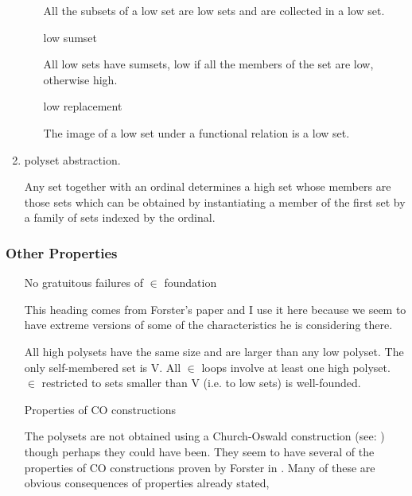 \documentclass{article}
\begin{document}
\begin{article}
\begin{enumerate}
\begin{itemize}
All the subsets of a low set are low sets and are collected in a low set.

\item [low sumset]\ 

All low sets have sumsets, low if all the members of the set are low, otherwise high.

\item [low replacement]\ 

The image of a low set under a functional relation is a low set.

\end{itemize}

\item polyset abstraction.

Any set together with an ordinal determines a high set whose members are those sets which can be obtained by instantiating a member of the first set by a family of sets indexed by the ordinal.

\end{enumerate}

\subsubsection{Other Properties}

\begin{itemize}

\item[No gratuitous failures of $\in$ foundation]\ 

This heading comes from Forster's paper \cite{forster2006} and I use it here because we seem to have extreme versions of some of the characteristics he is considering there.

All high polysets have the same size and are larger than any low polyset.
The only self-membered set is V.
All $\in$ loops involve at least one high polyset.
$\in$ restricted to sets smaller than V (i.e. to low sets) is well-founded.

\item[Properties of CO constructions]\ 

The polysets are not obtained using a Church-Oswald construction (see: \cite{forster2005}) though perhaps they could have been.
They seem to have several of the properties of CO constructions proven by Forster in \cite{forster2005}.
Many of these are obvious consequences of properties already stated,

\begin{itemize}


\end{itemize}
\end{itemize}
\end{article}
\end{document}
